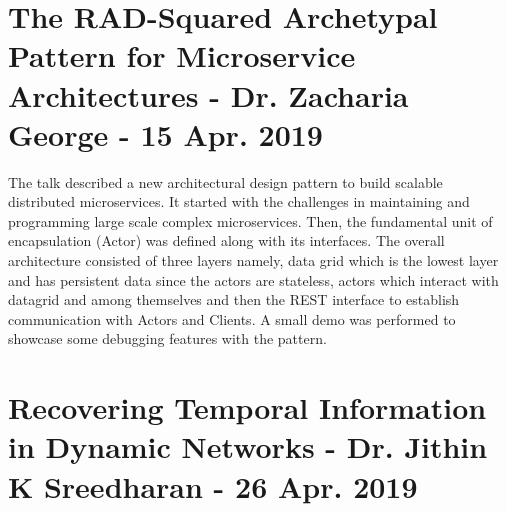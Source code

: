 \documentclass[11pt,a4paper,oneside]{article}
\begin{document}
	\section{The RAD-Squared Archetypal Pattern for Microservice Architectures - Dr. Zacharia George - 15 Apr. 2019}
	
	The talk described a new architectural design pattern to build scalable distributed microservices. It started with the challenges in maintaining and programming large scale complex microservices. Then, the fundamental unit of encapsulation (Actor) was defined along with its interfaces. The overall architecture consisted of three layers namely, data grid which is the lowest layer and has persistent data since the actors are stateless, actors which interact with datagrid and among themselves and then the REST interface to establish communication with Actors and Clients. A small demo was performed to showcase some debugging features with the pattern.
	
	\section{Recovering Temporal Information in Dynamic Networks - Dr. Jithin K Sreedharan - 26 Apr. 2019}
	
    
\end{document}
